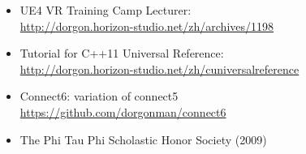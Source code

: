 \documentclass[a4paper,12pt]{memoir} %
\begin{document}
{\begin{itemize}
    \item UE4 VR Training Camp Lecturer: \\
      \href{http://dorgon.horizon-studio.net/zh/archives/1198}
          {http://dorgon.horizon-studio.net/zh/archives/1198}
  \end{itemize}

}

\Sep %
\Sep %
\Sep %




{
  \begin{itemize}
    \item Tutorial for C++11 Universal Reference: \\
        \href{http://dorgon.horizon-studio.net/zh/cuniversalreference}
             {http://dorgon.horizon-studio.net/zh/cuniversalreference} \\

        \item Connect6: variation of connect5  \\
        \href{https://github.com/dorgonman/connect6}
        {https://github.com/dorgonman/connect6} \\   

  \end{itemize}



}



\Sep %
\Sep %
\Sep %



\begin{itemize}
  \item The Phi Tau Phi Scholastic Honor Society (2009)
\end{itemize}
\end{document}
